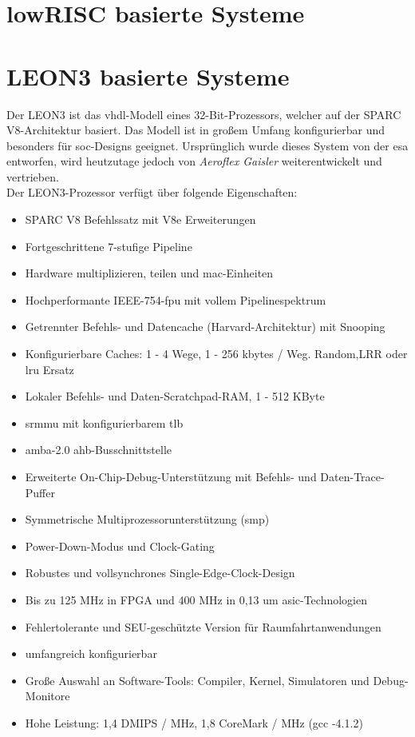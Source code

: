 \section{lowRISC basierte Systeme}\label{kap:lowrisc}


\section{LEON3 basierte Systeme}\label{kap:leon3}

Der LEON3 ist das \ac{vhdl}-Modell eines 32-Bit-Prozessors, welcher auf der SPARC V8-Architektur basiert. Das Modell ist in großem Umfang konfigurierbar und besonders für \ac{soc}-Designs geeignet.
Ursprünglich wurde dieses System von der \ac{esa} entworfen, wird heutzutage jedoch von \emph{Aeroflex Gaisler} weiterentwickelt und vertrieben.\\
Der LEON3-Prozessor verfügt über folgende Eigenschaften:\cite{leon}\\

\begin{itemize}
  \item SPARC V8 Befehlssatz mit V8e Erweiterungen
\item Fortgeschrittene 7-stufige Pipeline
\item Hardware multiplizieren, teilen und \ac{mac}-Einheiten
\item Hochperformante IEEE-754-\ac{fpu} mit vollem Pipelinespektrum
\item Getrennter Befehls- und Datencache (Harvard-Architektur) mit Snooping
\item Konfigurierbare Caches: 1 - 4 Wege, 1 - 256 kbytes / Weg. Random,LRR oder \ac{lru} Ersatz
\item Lokaler Befehls- und Daten-Scratchpad-RAM, 1 - 512 KByte
\item \ac{srmmu} mit konfigurierbarem \ac{tlb}
\item \ac{amba}-2.0 \ac{ahb}-Busschnittstelle
\item Erweiterte On-Chip-Debug-Unterstützung mit Befehls- und Daten-Trace-Puffer
\item Symmetrische Multiprozessorunterstützung (\ac{smp})
\item Power-Down-Modus und Clock-Gating
\item Robustes und vollsynchrones Single-Edge-Clock-Design
\item Bis zu 125 MHz in FPGA und 400 MHz in 0,13 um \ac{asic}-Technologien
\item Fehlertolerante und SEU-geschützte Version für Raumfahrtanwendungen
\item umfangreich konfigurierbar
\item Große Auswahl an Software-Tools: Compiler, Kernel, Simulatoren und Debug-Monitore
\item Hohe Leistung: 1,4 DMIPS / MHz, 1,8 CoreMark / MHz (gcc -4.1.2)
\end{itemize}
